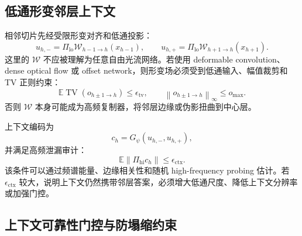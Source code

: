 \documentclass[11pt,a4paper,UTF8,fontset=fandol]{ctexart}
\theoremstyle{definition}
\newcommand{\norm}[1]{\left\lVert#1\right\rVert}
\newcommand{\E}{\mathbb{E}}
\begin{document}
\subsection{低通形变邻层上下文}

相邻切片先经受限形变对齐和低通投影：
\begin{equation}
\label{eq:ctx-lowpass-align-coreA}
    u_{h,-}=\Pi_{\mathrm{lo}}\mathcal W_{h-1\to h}(x_{h-1}),
    \qquad
    u_{h,+}=\Pi_{\mathrm{lo}}\mathcal W_{h+1\to h}(x_{h+1}).
\end{equation}
这里的 $\mathcal W$ 不应被理解为任意自由光流网络。若使用 deformable convolution、dense optical flow 或 offset network，则形变场必须受到低通输入、幅值裁剪和 TV 正则约束：
\begin{equation}
    \E\operatorname{TV}(o_{h\pm1\to h})\le\epsilon_{\mathrm{tv}},
    \qquad
    \norm{o_{h\pm1\to h}}_\infty\le o_{\max}.
\end{equation}
否则 $\mathcal W$ 本身可能成为高频复制器，将邻层边缘或伪影扭曲到中心层。

上下文编码为
\begin{equation}
\label{eq:context-code-coreA}
    c_h=G_\psi(u_{h,-},u_{h,+}),
\end{equation}
并满足高频泄漏审计：
\begin{equation}
\label{eq:ctx-hi-bound-coreA}
    \E\norm{\Pi_{\mathrm{hi}}c_h}\le\epsilon_{\mathrm{ctx}}.
\end{equation}
该条件可以通过频谱能量、边缘相关性和随机 high-frequency probing 估计。若 $\epsilon_{\mathrm{ctx}}$ 较大，说明上下文仍然携带邻层答案，必须增大低通尺度、降低上下文分辨率或加强门控。

\subsection{上下文可靠性门控与防塌缩约束}
\end{document}
